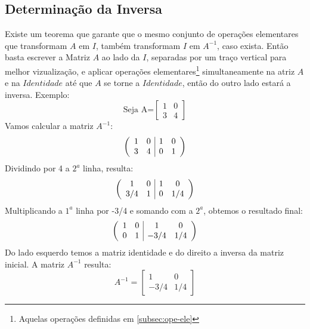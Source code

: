 \subsection{Determinação da Inversa}
Existe um teorema que garante que o mesmo conjunto de operações elementares que transformam $A$ em $I$, também transformam $I$ em $A^{-1}$, caso exista. Então basta escrever a Matriz $A$ ao lado da $I$, separadas por um traço vertical para melhor vizualização, e aplicar operações elementares\footnote{Aquelas operações definidas em \ref{subsec:ope-ele}} simultaneamente na atriz $A$ e na $Identidade$ até que $A$ se torne a $Identidade$, então do outro lado estará a inversa. Exemplo:
\begin{displaymath}
\text{Seja A=}
\begin{bmatrix}
  1 & 0 \\ 3 & 4
\end{bmatrix}
\end{displaymath}
Vamos calcular a matriz $A^{-1}$:
\begin{displaymath}
\left(
\begin{array}{c c|c c}
  1 & 0 & 1 & 0\\3 & 4 & 0 & 1
\end{array}\right)
\end{displaymath}
Dividindo por 4 a $2^a$ linha, resulta:
\begin{displaymath}
\left(\begin{array}{c c|c c}
  1 & 0 & 1 & 0\\3/4 & 1 & 0 & 1/4
\end{array}\right)
\end{displaymath}
Multiplicando a $1^a$ linha por -3/4 e somando com a $2^a$, obtemos o resultado final:
\begin{displaymath}
\left(\begin{array}{c c|c c}
  1 & 0 & 1 & 0\\0 & 1 & -3/4 & 1/4
\end{array}\right)
\end{displaymath}
Do lado esquerdo temos a matriz identidade e do direito a inversa da matriz inicial.
A matriz $A^{-1}$ resulta:
\begin{displaymath}
A^{-1}=\begin{bmatrix}
  1 & 0 \\ -3/4 & 1/4
\end{bmatrix}
\end{displaymath}
